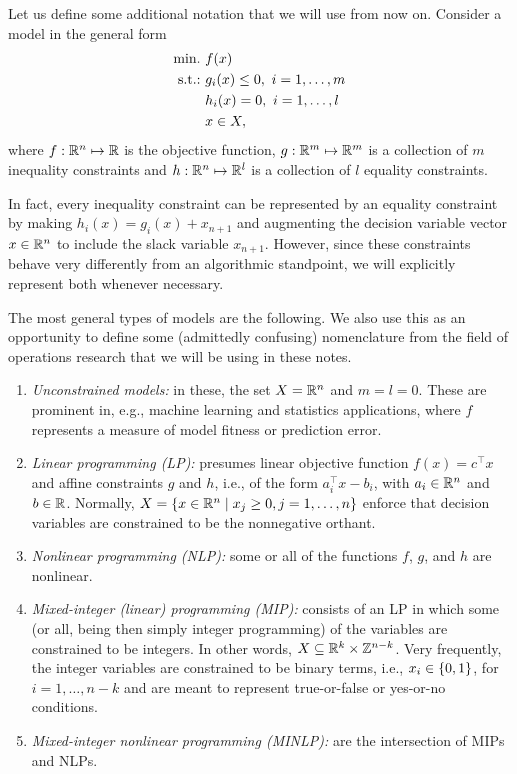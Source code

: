 Let us define some additional notation that we will use from now on. Consider a model in the general form
%
\begin{align*}
	\mathop{\text{min.~}} & f(x) \\
	\mathop{\text{s.t.:~}}   & g_i(x) \leq 0, ~i = 1, \dots, m \\
	      & h_i(x) = 0, ~i = 1, \dots, l \\
	      & x \in X,  
\end{align*}
%
where $f: \mathbb{R}^n \mapsto \mathbb{R}$ is the objective function, $g:\mathbb{R}^m \mapsto \mathbb{R}^m$ is a collection of $m$ inequality constraints and $h: \mathbb{R}^n \mapsto \mathbb{R}^l$ is a collection of $l$ equality constraints.

In fact, every inequality constraint can be represented by an equality constraint by making $h_i(x) = g_i(x) + x_{n+1}$ and augmenting the decision variable vector $x \in \mathbb{R}^n$ to include the slack variable $x_{n+1}$. However, since these constraints behave very differently from an algorithmic standpoint, we will explicitly represent both whenever necessary.

The most general types of models are the following. We also use this as an opportunity to define some (admittedly confusing) nomenclature from the field of operations research that we will be using in these notes.
%
\begin{enumerate}
    \item \emph{Unconstrained models:} in these, the set $X = \mathbb{R}^n$ and $m=l=0$. These are prominent in, e.g., machine learning and statistics applications, where $f$ represents a measure of model fitness or prediction error.  
    \item \emph{Linear programming (LP):} presumes linear objective function $f(x) = c^\top x$ and affine constraints $g$ and $h$, i.e., of the form $a_i^\top x - b_i$, with $a_i \in \mathbb{R}^n$ and $b \in \mathbb{R}$. Normally, $X = \left\{ x \in \mathbb{R}^n \mid x_j \geq 0, j = 1,\dots, n \right \}$ enforce that decision variables are constrained to be the nonnegative orthant.
    \item \emph{Nonlinear programming (NLP):} some or all of the functions $f$, $g$, and $h$ are nonlinear.
    \item \emph{Mixed-integer (linear) programming (MIP):} consists of an LP in which some (or all, being then simply integer programming) of the variables are constrained to be integers. In other words, $X \subseteq \mathbb{R}^k \times \mathbb{Z}^{n-k}$. Very frequently, the integer variables are constrained to be binary terms, i.e., $x_i \in \left\{ 0,1 \right \}$, for $i = 1,\dots, n-k$ and are meant to represent true-or-false or yes-or-no conditions.
    \item \emph{Mixed-integer nonlinear programming (MINLP):} are the intersection of MIPs and NLPs.  
\end{enumerate}

